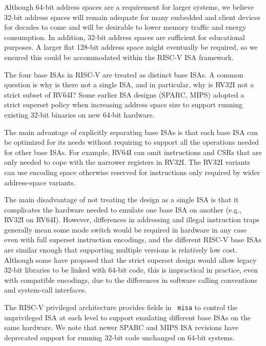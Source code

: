\begin{commentary}
Although 64-bit address spaces are a requirement for larger systems,
we believe 32-bit address spaces will remain adequate for many
embedded and client devices for decades to come and will be desirable
to lower memory traffic and energy consumption.  In addition, 32-bit
address spaces are sufficient for educational purposes.  A larger flat
128-bit address space might eventually be required, so we ensured this
could be accommodated within the RISC-V ISA framework.
\end{commentary}

\begin{commentary}
The four base ISAs in RISC-V are treated as distinct base ISAs.  A
common question is why is there not a single ISA, and in particular,
why is RV32I not a strict subset of RV64I?  Some earlier ISA designs
(SPARC, MIPS) adopted a strict superset policy when increasing address
space size to support running existing 32-bit binaries on new 64-bit
hardware.

The main advantage of explicitly separating base ISAs is that each
base ISA can be optimized for its needs without requiring to support
all the operations needed for other base ISAs.  For example, RV64I can
omit instructions and CSRs that are only needed to cope with the
narrower registers in RV32I.  The RV32I variants can use encoding
space otherwise reserved for instructions only required by wider
address-space variants.

The main disadvantage of not treating the design as a single ISA is
that it complicates the hardware needed to emulate one base ISA on
another (e.g., RV32I on RV64I).  However, differences in addressing
and illegal instruction traps generally mean some mode switch would be
required in hardware in any case even with full superset instruction
encodings, and the different RISC-V base ISAs are similar enough that
supporting multiple versions is relatively low cost.  Although some
have proposed that the strict superset design would allow legacy
32-bit libraries to be linked with 64-bit code, this is impractical in
practice, even with compatible encodings, due to the differences in
software calling conventions and system-call interfaces.

The RISC-V privileged architecture provides fields in {\tt
  misa} to control the unprivileged ISA at each level to support emulating
different base ISAs on the same hardware.  We note that newer SPARC
and MIPS ISA revisions have deprecated support for running 32-bit code
unchanged on 64-bit systems.


\end{commentary}
